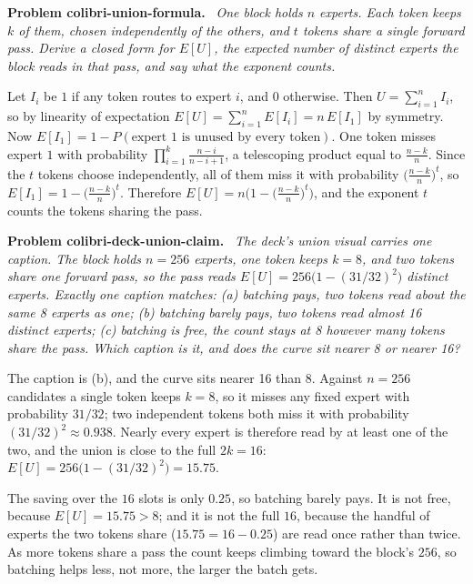 \documentclass[11pt]{article}
\newenvironment{problem}[1]
  {\par\medskip\noindent\textbf{Problem #1.}\ \itshape}
  {\par\medskip}
\begin{document}
\begin{problem}{colibri-union-formula}
One block holds $n$ experts. Each token keeps $k$ of them, chosen independently of the others, and $t$ tokens share a single forward pass. Derive a closed form for $E[U]$, the expected number of distinct experts the block reads in that pass, and say what the exponent counts.
\end{problem}
Let $I_i$ be $1$ if any token routes to expert $i$, and $0$ otherwise. Then $U=\sum_{i=1}^{n}I_i$, so by linearity of expectation $E[U]=\sum_{i=1}^{n}E[I_i]=n\,E[I_1]$ by symmetry. Now $E[I_1]=1-P(\text{expert }1\text{ is unused by every token})$. One token misses expert $1$ with probability $\prod_{i=1}^{k}\frac{n-i}{n-i+1}$, a telescoping product equal to $\frac{n-k}{n}$. Since the $t$ tokens choose independently, all of them miss it with probability $\bigl(\frac{n-k}{n}\bigr)^t$, so $E[I_1]=1-\bigl(\frac{n-k}{n}\bigr)^t$. Therefore $E[U]=n\bigl(1-\bigl(\frac{n-k}{n}\bigr)^t\bigr)$, and the exponent $t$ counts the tokens sharing the pass.

\begin{problem}{colibri-deck-union-claim}
The deck's union visual carries one caption. The block holds $n=256$ experts, one token keeps $k=8$, and two tokens share one forward pass, so the pass reads $E[U]=256\bigl(1-(31/32)^2\bigr)$ distinct experts. Exactly one caption matches: (a) batching pays, two tokens read about the same 8 experts as one; (b) batching barely pays, two tokens read almost 16 distinct experts; (c) batching is free, the count stays at 8 however many tokens share the pass. Which caption is it, and does the curve sit nearer 8 or nearer 16?
\end{problem}
The caption is (b), and the curve sits nearer 16 than 8. Against $n=256$ candidates a single token keeps $k=8$, so it misses any fixed expert with probability $31/32$; two independent tokens both miss it with probability $(31/32)^2\approx0.938$. Nearly every expert is therefore read by at least one of the two, and the union is close to the full $2k=16$: $E[U]=256\bigl(1-(31/32)^2\bigr)=15.75$.

The saving over the $16$ slots is only $0.25$, so batching barely pays. It is not free, because $E[U]=15.75>8$; and it is not the full $16$, because the handful of experts the two tokens share ($15.75=16-0.25$) are read once rather than twice. As more tokens share a pass the count keeps climbing toward the block's $256$, so batching helps less, not more, the larger the batch gets.
\end{document}
